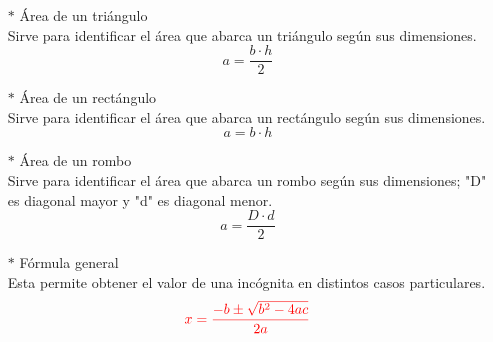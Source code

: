 \documentclass[letterpaper,pt12]{article}
\begin{document}
\begin{itemize}
\item[$\ast$]{Área de un triángulo}\\
Sirve para identificar el área que abarca un triángulo según sus dimensiones.
\begin{equation*}
    a=\frac{b\cdot h}{2}
\end{equation*}

\item[$\ast$]{Área de un rectángulo}\\
Sirve para identificar el área que abarca un rectángulo según sus dimensiones.
\begin{equation*}
    a=b\cdot h
\end{equation*}

\item[$\ast$]{Área de un rombo}\\
Sirve para identificar el área que abarca un rombo según sus dimensiones; "D" es diagonal mayor y "d" es diagonal menor.
\begin{equation*}
    a=\frac{D\cdot d}{2}
\end{equation*}

\item[$\ast$]{Fórmula general}\\
Esta permite obtener el valor de una incógnita en distintos casos particulares.
\begin{equation*}
     \textcolor{red}{x=\frac{-b \pm \sqrt{b^{2}- 4ac}} {2a}}
\end{equation*}
\end{itemize}   
   
\pagestyle{fancy}

\fancyhf{}
 \rfoot{\thepage}
   
\end{document}
